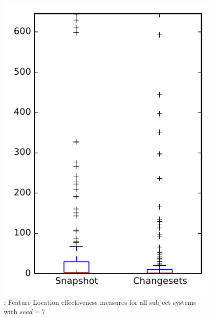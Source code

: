 
\begin{figure}
\centering
\includegraphics[height=0.4\textheight]{figures/flt_seed/rq1_overview_7}
\caption{\rone: Feature Location effectiveness measures for all subject systems with $seed=7$}
\label{fig:flt_seed:rq1:overview}
\end{figure}

